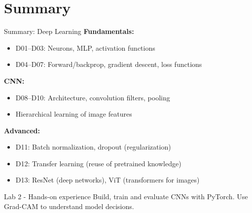 \documentclass[aspectratio=169, 10pt]{beamer}
\begin{document}
\section*{Summary}

\begin{frame}{Summary: Deep Learning}
    \textbf{Fundamentals:}
    \begin{itemize}
        \item D01--D03: Neurons, MLP, activation functions
        \item D04--D07: Forward/backprop, gradient descent, loss functions
    \end{itemize}
    
    \textbf{CNN:}
    \begin{itemize}
        \item D08--D10: Architecture, convolution filters, pooling
        \item Hierarchical learning of image features
    \end{itemize}
    
    \textbf{Advanced:}
    \begin{itemize}
        \item D11: Batch normalization, dropout (regularization)
        \item D12: Transfer learning (reuse of pretrained knowledge)
        \item D13: ResNet (deep networks), ViT (transformers for images)
    \end{itemize}
    
    \vspace{0.3cm}
    \begin{block}{Lab 2 - Hands-on experience}
        Build, train and evaluate CNNs with PyTorch. Use Grad-CAM to understand model decisions.
    \end{block}
\end{frame}
\end{document}
